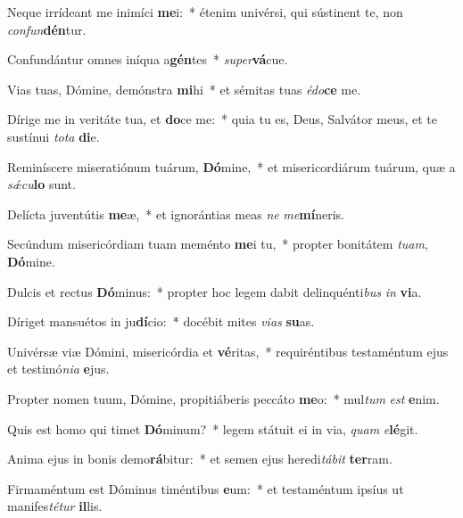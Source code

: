 \item Neque irrídeant me inimíci \textbf{me}i:~* étenim univérsi, qui sústinent te, non \textit{con}\textit{fun}\textbf{dén}tur.

\item Confundántur omnes iníqua a\textbf{gén}tes~* \textit{su}\textit{per}\textbf{vá}cue.

\item Vias tuas, Dómine, demónstra \textbf{mi}hi~* et sémitas tuas \textit{é}\textit{do}\textbf{ce} me.

\item Dírige me in veritáte tua, et \textbf{do}ce me:~* quia tu es, Deus, Salvátor meus, et te sustínui \textit{to}\textit{ta} \textbf{di}e.

\item Reminíscere miseratiónum tuárum, \textbf{Dó}mine,~* et misericordiárum tuárum, quæ a \textit{sǽ}\textit{cu}\textbf{lo} sunt.

\item Delícta juventútis \textbf{me}æ,~* et ignorántias meas \textit{ne} \textit{me}\textbf{mí}neris.

\item Secúndum misericórdiam tuam meménto \textbf{me}i tu,~* propter bonitátem \textit{tu}\textit{am}, \textbf{Dó}mine.

\item Dulcis et rectus \textbf{Dó}minus:~* propter hoc legem dabit delinquénti\textit{bus} \textit{in} \textbf{vi}a.

\item Díriget mansuétos in ju\textbf{dí}cio:~* docébit mites \textit{vi}\textit{as} \textbf{su}as.

\item Univérsæ viæ Dómini, misericórdia et \textbf{vé}ritas,~* requiréntibus testaméntum ejus et testimó\textit{ni}\textit{a} \textbf{e}jus.

\item Propter nomen tuum, Dómine, propitiáberis peccáto \textbf{me}o:~* mul\textit{tum} \textit{est} \textbf{e}nim.

\item Quis est homo qui timet \textbf{Dó}minum?~* legem státuit ei in via, \textit{quam} \textit{e}\textbf{lé}git.

\item Anima ejus in bonis demo\textbf{rá}bitur:~* et semen ejus heredi\textit{tá}\textit{bit} \textbf{ter}ram.

\item Firmaméntum est Dóminus timéntibus \textbf{e}um:~* et testaméntum ipsíus ut manifes\textit{té}\textit{tur} \textbf{il}lis.


